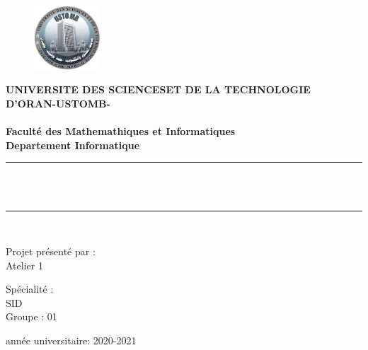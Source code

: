 
\begin{figure}
\vspace{-5 pt}
\includegraphics[width=2.5cm]{img/logo.jpg}
\centering
\end{figure}
 \textbf{\scriptsize UNIVERSITE DES SCIENCESET DE LA TECHNOLOGIE D’ORAN-USTOMB-  }\\ \\
 \textbf{\footnotesize
 Faculté des Mathemathiques et Informatiques \\
 Departement Informatique 
}
  \\[1.5cm]
\newcommand{\HRule}{\rule{\linewidth}{0.5mm}}

\begin{center}
\vfill

\HRule \\[0.6cm]

{\huge\bfseries{\color{blue}{MARIAGE STABLE : MATCH-UP}} \\[0.25cm]}
\HRule \\[1.5cm]
\vfill

\vfill
\vfill


\vfill
\large{  Projet  présenté par : } \\
Atelier 1 

\vfill

\large{Spécialité :} \\
SID\\
Groupe : 01
\vfill
\bigskip


\vfill

 \vfill
       
     \vfill

année universitaire: 2020-2021
 \end{center}

 
